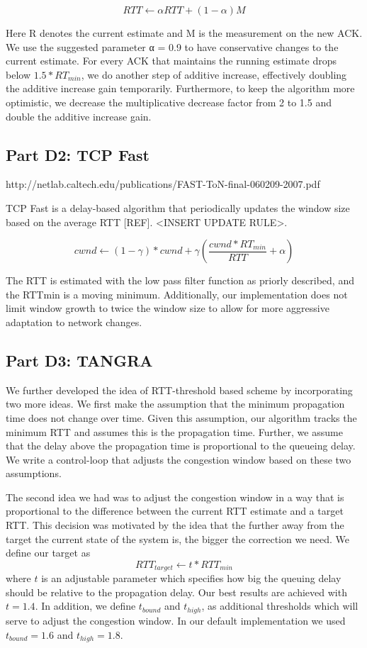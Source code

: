 \documentclass[12pt]{article}
\begin{document}
$${RTT} \leftarrow \alpha {RTT} + \left(1 - \alpha\right)M$$

Here R denotes the current estimate and M is the measurement on the new ACK. We
use the suggested parameter α = 0.9 to have conservative changes to the current
estimate. For every ACK that maintains the running estimate drops below
$1.5*RT_{min}$, we do another step of additive increase, effectively doubling
the additive increase gain temporarily. Furthermore, to keep the algorithm more
optimistic, we decrease the multiplicative decrease factor from 2 to 1.5 and
double the additive increase gain.

\subsection*{Part D2: TCP Fast}

http://netlab.caltech.edu/publications/FAST-ToN-final-060209-2007.pdf

TCP Fast is a delay-based algorithm that periodically updates the window size
based on the average RTT [REF]. <INSERT UPDATE RULE>.

$$cwnd \leftarrow (1 - \gamma)* cwnd + \gamma \left(\frac{cwnd * {RT_{min}}}{RTT} + \alpha \right)$$

The RTT is estimated with the low pass filter function as priorly described, and
the RTTmin is a moving minimum. Additionally, our implementation does not limit
window growth to twice the window size to allow for more aggressive adaptation
to network changes. 

\subsection*{Part D3: TANGRA}

We further developed the idea of RTT-threshold based scheme by incorporating two
more ideas. We first make the assumption that the minimum propagation time does
not change over time. Given this assumption, our algorithm tracks the minimum
RTT and assumes this is the propagation time. Further, we assume that the delay
above the propagation time is proportional to the queueing delay. We write a
control-loop that adjusts the congestion window based on these two assumptions.

The second idea we had was to adjust the congestion window in a way that is
proportional to the difference between the current RTT estimate and a target
RTT. This decision was motivated by the idea that the further away from the
target the current state of the system is, the bigger the correction we need. We
define our target as
$$RTT_{target} \leftarrow t * {RTT}_{min}$$
where $t$ is an adjustable parameter which specifies how big the queuing delay
should be relative to the propagation delay. Our best results are achieved with
$t = 1.4$. In addition, we define $t_{bound}$ and $t_{high}$, as additional
thresholds which will serve to adjust the congestion window. In our default
implementation we used $t_{bound} = 1.6$ and $t_{high} = 1.8$.
\end{document}

